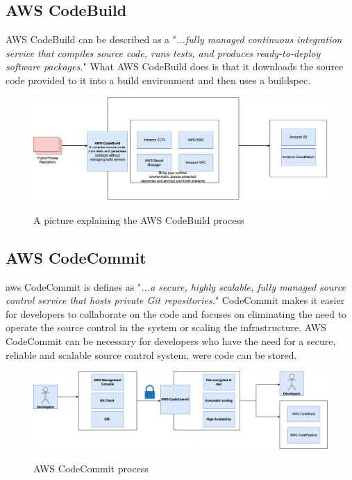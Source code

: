 \subsection{AWS CodeBuild }
AWS CodeBuild can be described as a "\textit{...fully managed continuous integration service that compiles source code, runs tests, and produces ready-to-deploy software packages.}"
\cite{AWSCodeBuild}
What AWS CodeBuild does is that it downloads the source code provided to it into a build environment and then uses a \Gls{buildspec}.\cite{AWSCodeBuild1}
\begin{figure}[htp]
    \centering
    \includegraphics[width=1\columnwidth]{Images/CodeBuild.png}
    \caption{A picture explaining the AWS CodeBuild process}\cite{AWSCodeBuild}
    \label{fig:my_label}
\end{figure}
\newpage
\subsection{AWS CodeCommit}

\acrshort{aws} CodeCommit is defines as "\textit{...a secure, highly scalable, fully managed source control service that hosts private Git repositories.}"
\cite{AWSCodeCommit1}
CodeCommit makes it easier for developers to collaborate on the code and focuses on eliminating the need to operate the source control in the system or scaling the infrastructure. AWS CodeCommit can be necessary for developers who have the need for a secure, reliable and scalable source control system, were code can be stored. \cite{AWSCodeCommit}
\begin{figure}[htp]
    \centering
    \includegraphics[width=1\columnwidth]{Images/CodeCommit.png}
    \caption{AWS CodeCommit process}\cite{AWSCodeCommit1}
    \label{fig:my_label}
\end{figure}

